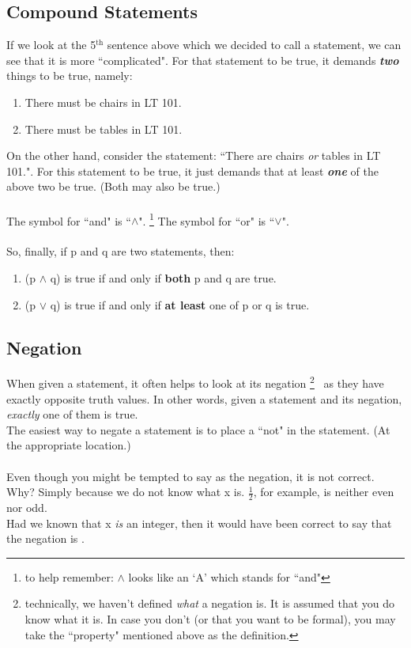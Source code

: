 \subsection{Compound Statements}\label{ssec:compound}
If we look at the 5$^{\text{th}}$ sentence above which we decided to call a statement, we can see that it is more ``complicated". For that statement to be true, it demands \textbf{\textit{two}} things to be true, namely:
\begin{enumerate}
    \itemsep0em
    \item There must be chairs in LT 101.
    \item There must be tables in LT 101.
\end{enumerate}
On the other hand, consider the statement: ``There are chairs \textit{or} tables in LT 101.". For this statement to be true, it just demands that at least \textbf{\textit{one}} of the above two be true. (Both may also be true.)\\~\\
The symbol for ``and" is ``$\land$".%
\footnote{to help remember: $\land$ looks like an `A' which stands for ``and"}%
The symbol for ``or" is ``$\lor$".\\~\\
So, finally, if p and q are two statements, then:
\begin{enumerate}[label = C\arabic*.]
    \itemsep0em
    \item \label{comp1}(p $\land$ q) is true if and only if \textbf{both} p and q are true.
    \item \label{comp2}(p $\lor$ q) is true if and only if \textbf{at least} one of p or q is true.
\end{enumerate}
%
%
%
\subsection{Negation}\label{ssec:neg}
When given a statement, it often helps to look at its negation%
\footnote{\label{ft:neg} technically, we haven't defined \textit{what} a negation is. It is assumed that you do know what it is. In case you don't (or that you want to be formal), you may take the ``property" mentioned above as the definition.}%
\ 
as they have exactly opposite truth values. In other words, given a statement and its negation, \textit{exactly} one of them is true.\\

The easiest way to negate a statement is to place a ``not" in the statement. (At the appropriate location.)\\
\\
Even though you might be tempted to say  as the negation, it is not correct.\\
Why? Simply because we do not know what x is. $\frac{1}{2}$, for example, is neither even nor odd.\\
Had we known that x \textit{is} an integer, then it would have been correct to say that the negation is .\\

